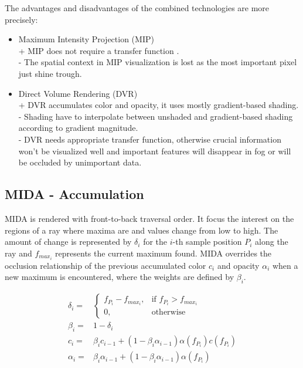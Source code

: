 The advantages and disadvantages of the combined technologies are more precisely:

\begin{itemize}
\item Maximum Intensity Projection (MIP) \\
+ MIP does not require a transfer function .\\
- The spatial context in MIP visualization is lost as the most important pixel just shine trough. \\
\item Direct Volume Rendering (DVR)\\
+ DVR accumulates color and opacity, it uses mostly gradient-based shading. \\
- Shading have to interpolate between unshaded and gradient-based shading according to gradient magnitude. \\ 
- DVR needs appropriate transfer function, otherwise crucial information won't be visualized well 
  and important features will disappear in fog or will be occluded by unimportant data.
\end{itemize}

\subsection{MIDA - Accumulation}
\label{sec:Accumulation}

MIDA is rendered with front-to-back traversal order.  
It focus the interest on the regions of a ray where maxima are and values change from low to high. The amount of change is represented by $\delta_i$ for the $i$-th sample position $P_i$ along the ray and $f_{max_i}$ represents the current maximum found.
MIDA overrides the occlusion relationship of the previous accumulated color $c_i$ and opacity $\alpha_i$ when a new maximum is encountered, where the weights are defined by $\beta_i$.

\begin{eqnarray}
\delta_i = & \begin{cases}
f_{P_i} - f_{max_i}, & \text{if $f_{P_i} > f_{max_i}$}\\
0, & \text{otherwise}
\end{cases} \\
\beta_i = & 1 - \delta_i \\
c_i = & \beta_i c_{i-1} + (1 - \beta_i \alpha_{i-1}) \alpha(f_{P_i})c(f_{P_i}) \\
\alpha_i = & \beta_i \alpha_{i-1} + (1 - \beta_i \alpha_{i-1}) \alpha(f_{P_i}) 
\label{eqn:MIDA}
\end{eqnarray}

